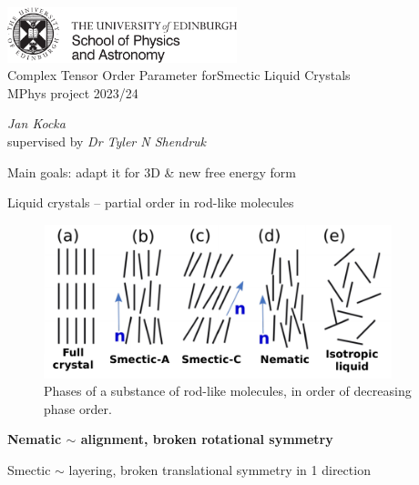 \documentclass[10pt,mathserif]{beamer}
\begin{document}
\setlength{\abovedisplayskip}{1em}
\setlength{\belowdisplayskip}{0ex}

\begin{frame}
    \centering
    \includegraphics[width=0.5\textwidth]{figures/PandA_black.pdf} \\
    \vspace{2em}
    \LARGE
    Complex Tensor Order Parameter for\linebreak Smectic Liquid Crystals \\
    \normalsize
    \vspace{0.5em}
    MPhys project 2023/24 \\

    \vspace{2em}

    \emph{Jan Kocka} \\
    \footnotesize supervised by \emph{Dr Tyler N Shendruk}

    \vspace{3em}

    \normalsize
    Main goals: adapt it for 3D \hspace{1ex}\&\hspace{1ex} new free energy form
\end{frame}

\begin{frame}[fragile]{Liquid crystals -- partial order in rod-like molecules}
    \newrefsection
    \begin{figure}
        \centering
        \includegraphics[width=0.9\textwidth]{figures/phases.pdf}
        \caption{
            Phases of a substance of rod-like molecules, in order of decreasing phase order\cite{pagetComplexTensorsSimple2023}.
        }
    \end{figure}
    \vspace{-1em}
    \bf
    Nematic $\sim$ alignment, broken rotational symmetry

    Smectic $\sim$ layering, broken translational symmetry in 1 direction
    \vfill
    \printbibliography[heading=none]
    \vspace{-\fill}
\end{frame}
\end{document}
